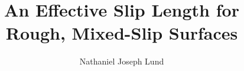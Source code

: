 \documentclass[12pt, a4paper, twoside, openright]{book}
\begin{document}
\frontmatter

\title{An Effective Slip Length for Rough, Mixed-Slip Surfaces}

\author{Nathaniel Joseph Lund}

\subject{Physics}


\phd


\maketitle



\tableofcontents



\mainmatter







\appendix







\backmatter  %

%


\end{document}
